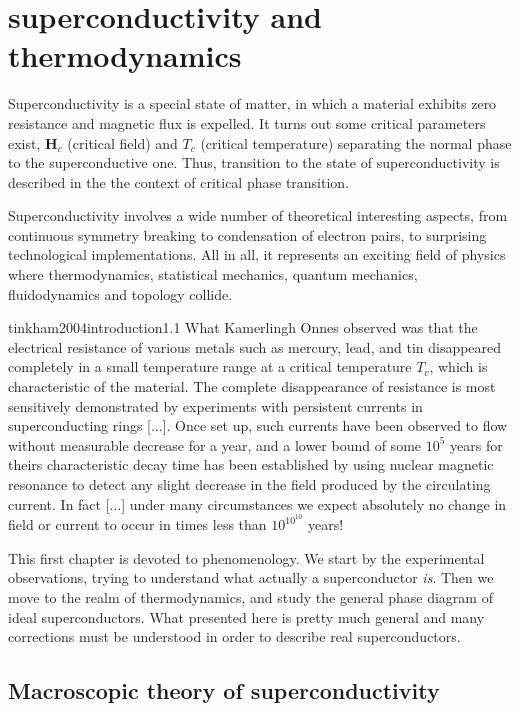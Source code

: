 \chapter{superconductivity and thermodynamics}\label{chap:superconductivity and thermodynamics}\chaptertoc{}

Superconductivity is a special state of matter, in which a material exhibits zero resistance and magnetic flux is expelled. It turns out some critical parameters exist, $\mathbf{H}_c$ (critical field) and $T_c$ (critical temperature) separating the normal phase to the superconductive one. Thus, transition to the state of superconductivity is described in the the context of critical phase transition.

Superconductivity involves a wide number of theoretical interesting aspects, from continuous symmetry breaking to condensation of electron pairs, to surprising technological implementations. All in all, it represents an exciting field of physics where thermodynamics, statistical mechanics, quantum mechanics, fluidodynamics and topology collide.

\begin{cit}{tinkham2004introduction}{1.1}
    What Kamerlingh Onnes observed was that the electrical resistance of various metals such as mercury, lead, and tin disappeared completely in a small temperature range at a critical temperature $T_c$, which is characteristic of the material. The complete disappearance of resistance is most sensitively demonstrated by experiments with persistent currents in superconducting rings [...]. Once set up, such currents have been observed to flow without measurable decrease for a year, and a lower bound of some $10^5$ years for theirs characteristic decay time has been established by using nuclear magnetic resonance to detect any slight decrease in the field produced by the circulating current. In fact [...] under many circumstances we expect absolutely no change in field or current to occur in times less than $10^{10^10}$ years!
\end{cit}

This first chapter is devoted to phenomenology. We start by the experimental observations, trying to understand what actually a superconductor \textit{is}. Then we move to the realm of thermodynamics, and study the general phase diagram of ideal superconductors. What presented here is pretty much general and many corrections must be understood in order to describe real superconductors.

\section{Macroscopic theory of superconductivity}

